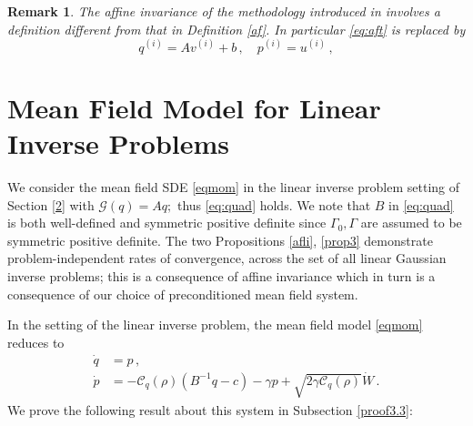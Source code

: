 \documentclass[12pt]{caltech_thesis}
\newtheorem{remark}[theorem]{Remark}
\numberwithin{equation}{section}
\begin{document}
\vspace{0.1in}

\begin{remark}
The affine invariance of the methodology introduced
in \cite{leimkuhler2018ensemble} involves a definition different
from that in Definition \ref{af}. In particular \eqref{eq:aft}
is replaced by 
\begin{equation}
\label{eq:aft2}
q^{(i)}=A v^{(i)}+b\,,\quad p^{(i)}=u^{(i)}\,,
\end{equation} 
\end{remark}
\section{Mean Field Model for Linear Inverse Problems}
\label{2l}

{We consider the mean field SDE \eqref{eqmom}
in the linear inverse problem setting of Section \ref{2} with $\mathcal{G}(q)=Aq;$ thus
\eqref{eq:quad} holds.  We note that $B$ in \eqref{eq:quad}
is both well-defined and symmetric positive definite since
$\Gamma_0, \Gamma$ are assumed to be symmetric positive definite.
{The two Propositions \ref{afli}, \ref{prop3}
demonstrate problem-independent rates of convergence, across the
set of all linear Gaussian inverse problems; this is a consequence} 
of affine invariance which in turn is a consequence
of our choice of preconditioned mean field system.

In the setting of the linear inverse problem, the mean field model \eqref{eqmom} reduces to
\begin{equation}
\label{linearp}
\begin{aligned}
\dot{q}&= p\,, \\
\dot{p}&=-\mathcal{C}_q(\rho)(B^{-1}q-c) - {\gamma}{p}+\sqrt{2 {\gamma}\mathcal{C}_q(\rho)}\dot{W}\,.
\end{aligned}
\end{equation}
We prove the following result about this system in Subsection \ref{proof3.3}:}

\vspace{0.1in}
\end{document}
